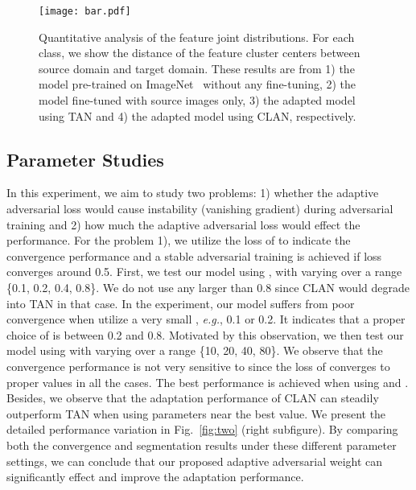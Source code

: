 \documentclass[10pt,twocolumn,letterpaper]{article}
\begin{document}
\begin{figure*}[ht]
\centering
\texttt{[image: bar.pdf]}
\caption{Quantitative analysis of the feature joint distributions. For each class, we show the distance of the feature cluster centers between source domain and target domain. These results are from 1) the model pre-trained on ImageNet~\cite{deng2009imagenet} without any fine-tuning, 2) the model fine-tuned with source images only, 3) the adapted model using TAN and 4) the adapted model using CLAN, respectively.}
\label{fig:bar}
\end{figure*}

\subsection{Parameter Studies}\label{sec:parameter}
In this experiment, we aim to study two problems: 1) whether the adaptive adversarial loss would cause instability (vanishing gradient) during adversarial training and 2) how much the adaptive adversarial loss would effect the performance. For the problem 1), we utilize the loss of  to indicate the convergence performance and a stable adversarial training is achieved if  loss converges around 0.5. First, we test our model using , with varying  over a range \{0.1, 0.2, 0.4, 0.8\}. We do not use any  larger than 0.8 since CLAN would degrade into TAN in that case.
In the experiment, our model suffers from poor convergence when utilize a very small , \emph{e.g.}, 0.1 or 0.2. It indicates that a proper choice of  is between 0.2 and 0.8. Motivated by this observation, we then test our model using  with varying  over a range \{10, 20, 40, 80\}. We observe that the convergence performance is not very sensitive to  since the loss of  converges to proper values in all the cases. The best performance is achieved when using  and . Besides, we observe that the adaptation performance of CLAN can steadily outperform TAN when using parameters near the best value. We present the detailed performance variation in Fig.~\ref{fig:two} (right subfigure). By comparing both the convergence and segmentation results under these different parameter settings, we can conclude that our proposed adaptive adversarial weight can significantly effect and improve the adaptation performance. 
\end{document}
